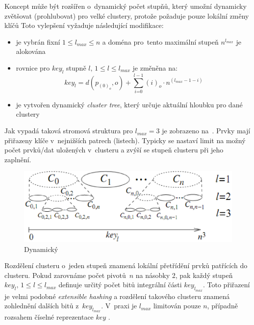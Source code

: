 Koncept  může být rozšířen o~dynamický počet stupňů, který umožní  dynamicky zvětšovat (prohlubovat) pro velké clustery, protože  požaduje pouze lokální změny klíčů 
Toto vylepšení vyžaduje následující modifikace:
\begin{itemize}
\item je vybrán fixní  $1\leq l_{max}\leq n$
a doména pro~tento maximální stupeň $n^{l_{max}}$ je alokována
\item rovnice  pro $key_{l}$ stupně $l,\,1\leq l\leq l_{max}$
je změněna na\cite{Novak:2009:MIE:1637863.1638184}:
\begin{equation}
key_{l}=d(p_{(0)_{o}},o)+\sum_{i\text{=0}}^{l-1}(i)_{o}\cdot n{}^{(l_{max}-1-i)}\label{eq:M-Index-key-max-level}
\end{equation}

\item je vytvořen dynamický \emph{cluster tree}, který určuje aktuální hloubku
pro dané \MIndex{} clustery
\end{itemize}
Jak vypadá taková stromová struktura pro $l_{max}=3$ je zobrazeno
na~\cite{Novak:2009:MIE:1637863.1638184}. Prvky mají přiřazeny
klíče v~nejnižších patrech (listech). Typicky se nastaví limit na
možný počet prvků/dat uložených v~clusteru a zvýší se stupeň clusteru
při jeho zaplnění.

\begin{figure}[t]
\centering
\includegraphics[scale=0.5]{m-index-dynamic-cluster}
\caption{Dynamický \MIndex{}}
\label{fig:Dynamic-Cluster-Tree}
\end{figure}

Rozdělení clusteru o~jeden stupeň znamená lokální přetřídění prvků
patřících do clusteru. Pokud zarovnáme počet pivotů~$n$ na násobky
2, pak každý stupeň $key_{l},\,1\leq l\leq l_{max}$ definuje určitý
počet bitů integrální části $key_{l_{max}}$\@. Toto přiřazení je
velmi podobné \emph{extensible hashing}\cite{Fagin:1979:EHF:320083.320092}
a rozdělení takového clusteru znamená zohlednění dalších bitů z~$key_{l_{max}}$\@.
V~praxi je $l_{max}$ limitován pouze $n$, případně rozsahem číselné
reprezentace $key$ \@.


